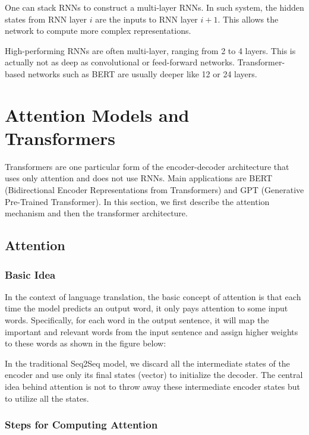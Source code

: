 \documentclass[
]{book}
\begin{document}
One can stack RNNs to construct a multi-layer RNNs. In such system, the hidden states from RNN layer \(i\) are the inputs to RNN layer \(i+1\). This allows the network to compute more complex representations.

High-performing RNNs are often multi-layer, ranging from 2 to 4 layers. This is actually not as deep as convolutional or feed-forward networks. Transformer-based networks such as BERT are usually deeper like 12 or 24 layers.

\hypertarget{attention-models-and-transformers}{%
\chapter{Attention Models and Transformers}\label{attention-models-and-transformers}}

Transformers are one particular form of the encoder-decoder architecture that uses only attention and does not use RNNs. Main applications are BERT (Bidirectional Encoder Representations from Transformers) and GPT (Generative Pre-Trained Transformer). In this section, we first describe the attention mechanism and then the transformer architecture.

\hypertarget{attention}{%
\section{Attention}\label{attention}}

\hypertarget{basic-idea}{%
\subsection{Basic Idea}\label{basic-idea}}

In the context of language translation, the basic concept of attention is that each time the model predicts an output word, it only pays attention to some input words. Specifically, for each word in the output sentence, it will map the important and relevant words from the input sentence and assign higher weights to these words as shown in the figure below:

In the traditional Seq2Seq model, we discard all the intermediate states of the encoder and use only its final states (vector) to initialize the decoder. The central idea behind attention is not to throw away these intermediate encoder states but to utilize all the states.

\hypertarget{steps-for-computing-attention}{%
\subsection{Steps for Computing Attention}\label{steps-for-computing-attention}}
\end{document}
